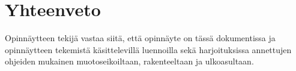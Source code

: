 \section{Yhteenveto}

Opinnäytteen tekijä vastaa siitä, että opinnäyte on tässä dokumentissa
ja opinnäytteen tekemistä käsittelevillä luennoilla sekä
harjoituksissa annettujen ohjeiden mukainen muotoseikoiltaan,
rakenteeltaan ja ulkoasultaan.